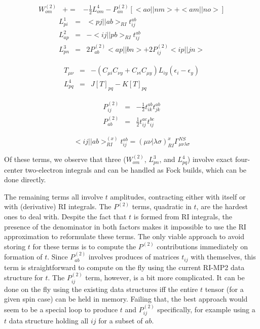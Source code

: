 \documentclass[fleqn,12pt]{article}
\newcommand{\half}{\frac{1}{2}}
\newcommand{\bra}{<\!}
\newcommand{\ket}{\!>}
\newcommand{\tijab}{{t_{ij}^{ab}}}
\newcommand{\Ptwo}{P^{(2)}}
\newcommand{\Wtwo}{W^{(2)}}
\newcommand{\intari}[2]{\bra #1 || #2 \ket_{RI}}
\newcommand{\intmri}[2]{( #1 | #2 )_{RI}}
\begin{document}
\begin{changebar}
\begin{eqnarray}
  \Wtwo_{om} & += & -\half L^4_{om}  - \Ptwo_{an} \left[ \bra ao||nm \ket
    + \bra am||no \ket \right]
\end{eqnarray}
\begin{eqnarray}
  L^1_{pi} & = & \intari{pj}{ab} \tijab \\
  L^2_{ap} & = & - \intari{ij}{pb} \tijab \\
  L^3_{pn} & = & 2 \Ptwo_{ab} \bra ap || bn \ket + 2 \Ptwo_{ij} \bra ip
  || jn \ket 
\end{eqnarray}

\begin{eqnarray}
  T_{\mu \nu} & = & - \left(C_{\mu i} C_{\nu y} + C_{\nu i} C_{\mu y}
  \right) L_{iy} \left( \epsilon_i - \epsilon_y \right) \\ L^4_{pq} &
  = & J[T]_{pq} - K[T]_{pq}
\end{eqnarray}

\begin{eqnarray}
  \Ptwo_{ij} & = & -\half t_{ik}^{ab} t_{jk}^{ab} \\
  \Ptwo_{ab} & = & \half t_{ij}^{ac} t_{ij}^{bc} 
\end{eqnarray}

\begin{equation}
\intari{ij}{ab}^{(x)} \tijab 
 = \intmri{\mu \nu}{\lambda \sigma}^{x} \Gamma^{NS}_{\mu\nu\lambda\sigma}
\end{equation}

Of these terms, we observe that three ($\Wtwo_{om}$, $L^{3}_{pn}$, and
$L^{4}_{pq}$) involve exact four-center two-electron integrals and can
be handled as Fock builds, which can be done directly.

The remaining terms all involve $t$ amplitudes, contracting either
with itself or with (derivative) RI integrals.  The $P^{(2)}$ terms,
quadratic in $t$, are the hardest ones to deal with.  Despite the fact
that $t$ is formed from RI integrals, the presence of the denominator
in both factors makes it impossible to use the RI approximation to
reformulate these terms.  The only viable approach to avoid storing
$t$ for these terms is to compute the $P^{(2)}$ contributions
immediately on formation of $t$.  Since $P^{(2)}_{ab}$ involves
produces of matrices $t_{ij}$ with themselves, this term is
straightforward to compute on the fly using the current RI-MP2 data
structure for $t$.  The $P^{(2)}_{ij}$ term, however, is a bit more
complicated.  It can be done on the fly using the existing data
structures iff the entire $t$ tensor (for a given spin case) can be
held in memory.  Failing that, the best approach would seem to be a
special loop to produce $t$ and $P^{(2)}_{ij}$ specifically, for
example using a $t$ data structure holding all $ij$ for a subset of
$ab$.


\end{changebar}
\end{document}
